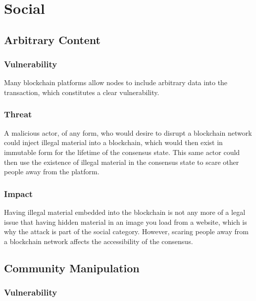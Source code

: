 \documentclass[11pt,a4paper,draft]{article}
\begin{document}
\section{Social}

\subsection{Arbitrary Content}

\subsubsection{Vulnerability}

Many blockchain platforms allow nodes to include arbitrary data into the transaction, which constitutes a clear vulnerability.\\

\subsubsection{Threat}

A malicious actor, of any form, who would desire to disrupt a blockchain network could inject illegal material into a blockchain, which would then exist in immutable form for the lifetime of the consensus state. This same actor could then use the existence of illegal material in the consensus state to scare other people away from the platform.\\

\subsubsection{Impact}

Having illegal material embedded into the blockchain is not any more of a legal issue that having hidden material in an image you load from a website, which is why the attack is part of the social category. However, scaring people away from a blockchain network affects the accessibility of the consensus.\\

\subsection{Community Manipulation}

\subsubsection{Vulnerability}
\end{document}
